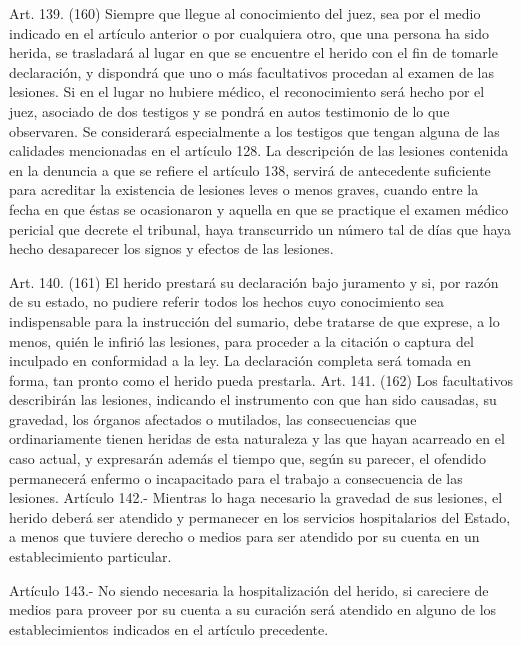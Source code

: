     Art. 139. (160)  Siempre que llegue al conocimiento del juez, sea por el medio indicado en el artículo anterior o por cualquiera otro, que una persona ha sido herida, se trasladará al lugar en que se encuentre el herido con el fin de tomarle declaración, y dispondrá que uno o más facultativos procedan al examen de las lesiones.
    Si en el lugar no hubiere médico, el reconocimiento será hecho por el juez, asociado de dos testigos y se pondrá en autos testimonio de lo que observaren. Se considerará especialmente a los testigos que tengan alguna de las calidades mencionadas en el artículo 128.
    La descripción de las lesiones contenida en la denuncia a que se refiere el artículo 138, servirá de antecedente suficiente para acreditar la existencia de lesiones leves o menos graves, cuando entre la fecha en que éstas se ocasionaron y aquella en que se practique el examen médico pericial que decrete el tribunal, haya transcurrido un número tal de días que haya hecho desaparecer los signos y efectos de las lesiones.

    Art. 140. (161) El herido prestará su declaración bajo juramento y si, por razón de su estado, no pudiere referir todos los hechos cuyo conocimiento sea indispensable para la instrucción del sumario, debe tratarse de que exprese, a lo menos, quién le infirió las lesiones, para proceder a la citación o captura del inculpado en conformidad a la ley.
    La declaración completa será tomada en forma, tan pronto como el herido pueda prestarla.
    Art. 141. (162) Los facultativos describirán las lesiones, indicando el instrumento con que han sido causadas, su gravedad, los órganos afectados o mutilados, las consecuencias que ordinariamente tienen heridas de esta naturaleza y las que hayan acarreado en el caso actual, y expresarán además el tiempo que, según su parecer, el ofendido permanecerá enfermo o incapacitado para el trabajo a consecuencia de las lesiones.
    Artículo 142.- Mientras lo haga necesario la gravedad de sus lesiones, el herido deberá ser atendido y permanecer en los servicios hospitalarios del Estado, a menos que tuviere derecho o medios para ser atendido por su cuenta en un establecimiento particular.

    Artículo 143.- No siendo necesaria la hospitalización del herido, si careciere de medios para proveer por su cuenta a su curación será atendido en alguno de los establecimientos indicados en el artículo precedente.

